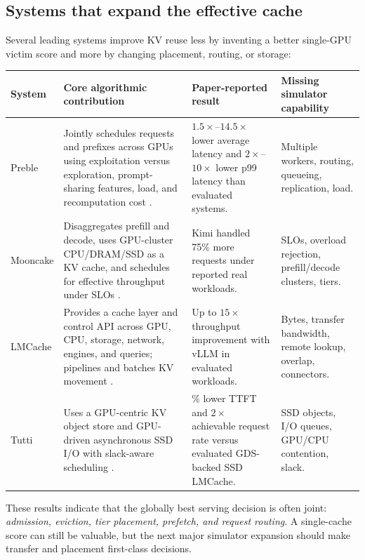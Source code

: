 \documentclass[11pt]{article}
\begin{document}
\subsection{Systems that expand the effective cache}

Several leading systems improve KV reuse less by inventing a better single-GPU victim
score and more by changing placement, routing, or storage:

\begin{longtable}{>{\raggedright\arraybackslash}p{}
                  >{\raggedright\arraybackslash}p{}
                  >{\raggedright\arraybackslash}p{}
                  >{\raggedright\arraybackslash}p{}}
\toprule
\textbf{System} & \textbf{Core algorithmic contribution} &
\textbf{Paper-reported result} & \textbf{Missing simulator capability} \\
\midrule
\endhead
Preble &
Jointly schedules requests and prefixes across GPUs using exploitation versus
exploration, prompt-sharing features, load, and recomputation cost
\cite{preble}. &
\(1.5\times\)--\(14.5\times\) lower average latency and \(2\times\)--\(10\times\)
lower p99 latency than evaluated systems. &
Multiple workers, routing, queueing, replication, load. \\
Mooncake &
Disaggregates prefill and decode, uses GPU-cluster CPU/DRAM/SSD as a KV cache, and
schedules for effective throughput under SLOs \cite{mooncake}. &
Kimi handled 75\% more requests under reported real workloads. &
SLOs, overload rejection, prefill/decode clusters, tiers. \\
LMCache &
Provides a cache layer and control API across GPU, CPU, storage, network, engines, and
queries; pipelines and batches KV movement \cite{lmcache}. &
Up to \(15\times\) throughput improvement with vLLM in evaluated workloads. &
Bytes, transfer bandwidth, remote lookup, overlap, connectors. \\
Tutti &
Uses a GPU-centric KV object store and GPU-driven asynchronous SSD I/O with
slack-aware scheduling \cite{tutti}. &
78.3\% lower TTFT and \(2\times\) achievable request rate versus evaluated
GDS-backed SSD LMCache. &
SSD objects, I/O queues, GPU/CPU contention, slack. \\
\bottomrule
\end{longtable}

These results indicate that the globally best serving decision is often joint:
\emph{admission, eviction, tier placement, prefetch, and request routing}.  A
single-cache score can still be valuable, but the next major simulator expansion should
make transfer and placement first-class decisions.
\end{document}
